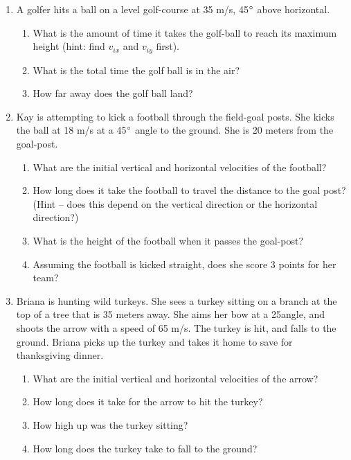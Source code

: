 \documentclass[letterpaper, 12pt]{article}
\begin{document}
\begin{enumerate}
\item A golfer hits a ball on a level golf-course at 35 m/s, 45$\degree$ above horizontal.
\begin{enumerate}
	\item What is the amount of time it takes the golf-ball to reach its maximum height (hint: find $v_{ix}$ and $v_{iy}$ first).
	\vspace{0.55in}
	\item What is the total time the golf ball is in the air?
	\vspace{0.55in}
	\item How far away does the golf ball land?
	\vspace{0.5in}
\end{enumerate}
\pagebreak
\item Kay is attempting to kick a football through the field-goal posts.  She kicks the ball at 18 m/s at a 45$\degree$ angle to the ground.  She is 20 meters from the goal-post.
\begin{enumerate}
	\item What are the initial vertical and horizontal velocities of the football?
	\vspace{0.6in}
	\item How long does it take the football to travel the distance to the goal post?  (Hint – does this depend on the vertical direction or the horizontal direction?)
	\vspace{0.6in}
	\item What is the height of the football when it passes the goal-post?
	\vspace{0.6in}
	\item Assuming the football is kicked straight, does she score 3 points for her team?
	\vspace{0.6in}
\end{enumerate}


\item Briana is hunting wild turkeys.  She sees a turkey sitting on a branch at the top of a tree that is 35 meters away.  She aims her bow at a 25\degree angle, and shoots the arrow with a speed of 65 m/s.  The turkey is hit, and falls to the ground.  Briana picks up the turkey and takes it home to save for thanksgiving dinner.

\begin{enumerate}
	\item What are the initial vertical and horizontal velocities of the arrow?
	\vspace{0.6in}
	\item How long does it take for the arrow to hit the turkey?
	\vspace{0.6in}
	\item How high up was the turkey sitting?
	\vspace{0.6in}
	\item{How long does the turkey take to fall to the ground?}
\end{enumerate}


 
\end{enumerate}
\end{document}
